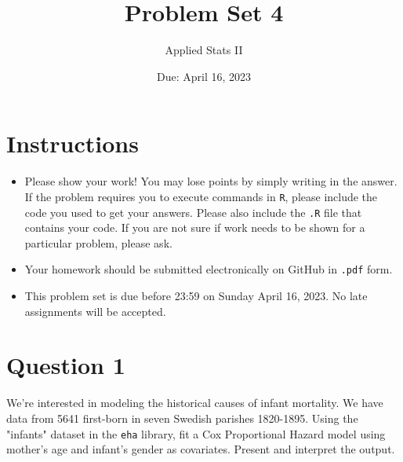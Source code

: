 \documentclass[12pt,letterpaper]{article}
\title{Problem Set 4}
\date{Due: April 16, 2023}
\author{Applied Stats II}
\begin{document}
	\maketitle
	\section*{Instructions}
	\begin{itemize}
	\item Please show your work! You may lose points by simply writing in the answer. If the problem requires you to execute commands in \texttt{R}, please include the code you used to get your answers. Please also include the \texttt{.R} file that contains your code. If you are not sure if work needs to be shown for a particular problem, please ask.
	\item Your homework should be submitted electronically on GitHub in \texttt{.pdf} form.
	\item This problem set is due before 23:59 on Sunday April 16, 2023. No late assignments will be accepted.

	\end{itemize}

	\vspace{.25cm}
\section*{Question 1}
\vspace{.25cm}
\noindent We're interested in modeling the historical causes of infant mortality. We have data from 5641 first-born in seven Swedish parishes 1820-1895. Using the "infants" dataset in the \texttt{eha} library, fit a Cox Proportional Hazard model using mother's age and infant's gender as covariates. Present and interpret the output.
\end{document}
